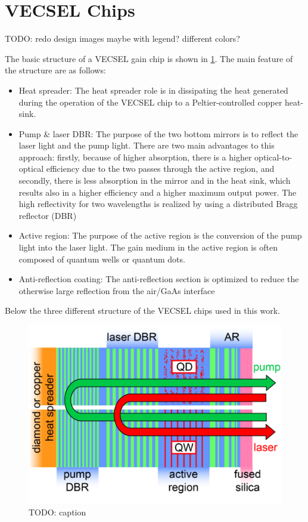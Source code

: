 \section{VECSEL Chips}\label{sec:vecsel}

TODO: redo design images maybe with legend? different colors?

The basic structure of a VECSEL gain chip is shown in \cref{fig:vecDes}. The main feature of the structure are as follows: 

\begin{itemize}
    \item Heat spreader: The heat spreader role is in dissipating the heat generated during the operation of the VECSEL chip to a Peltier-controlled copper heat-sink.
    \item Pump \& laser  DBR: The purpose of the two bottom mirrors is to reflect the laser light and the pump light. There are two main advantages to this approach: firstly, because of higher absorption, there is a higher optical-to-optical efficiency due to the two passes through the active region, and secondly, there is less absorption in the mirror and in the heat sink, which results also in a higher efficiency and a higher maximum output power. The high reflectivity for two wavelengths is realized by using a distributed Bragg reflector (DBR)
    \item Active region: The purpose of the active region is the conversion of the pump light into the laser light. The gain medium in the active region is often composed of quantum wells or quantum dots.
    \item Anti-reflection coating: The anti-reflection section is optimized to reduce the otherwise large reflection from the air/GaAs interface
\end{itemize}

Below the three different structure of the VECSEL chips used in this work.

\begin{figure}[ht]
    \centering
    \includegraphics[width=.6\linewidth]{images/VECSEL_structure.png}
    \caption{TODO: caption}
    \label{fig:vecDes}
\end{figure}


